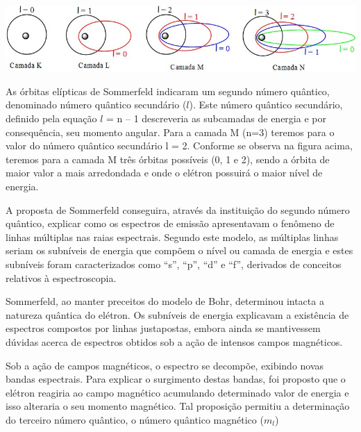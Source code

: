 \documentclass[10pt]{scrartcl}
\begin{document}
\begin{center}
\includegraphics[width=.9\linewidth]{Quimica-Geral-Aula/modelo-atomico-sommerfeld1.png}
\end{center}


As órbitas elípticas de Sommerfeld indicaram um segundo número quântico, denominado número quântico secundário (\(l\)). Este número quântico secundário, definido pela equação \(l\) = n – 1 descreveria as subcamadas de energia e por consequência, seu momento angular. Para a camada M (n=3) teremos para o valor do número quântico secundário l = 2. Conforme se observa na figura acima, teremos para a camada M três órbitas possíveis (0, 1 e 2), sendo a órbita de maior valor a mais arredondada e onde o elétron possuirá o maior nível de energia.

A proposta de Sommerfeld conseguira, através da instituição do segundo número quântico, explicar como os espectros de emissão apresentavam o fenômeno de linhas múltiplas nas raias espectrais. Segundo este modelo, as múltiplas linhas seriam os subníveis de energia que compõem o nível ou camada de energia e estes subníveis foram caracterizados como “s”, “p”, “d” e “f”, derivados de conceitos relativos à espectroscopia.

Sommerfeld, ao manter preceitos do modelo de Bohr, determinou intacta a natureza quântica do elétron. Os subníveis de energia explicavam a existência de espectros compostos por linhas justapostas, embora ainda se mantivessem dúvidas acerca de espectros obtidos sob a ação de intensos campos magnéticos.

Sob a ação de campos magnéticos, o espectro se decompõe, exibindo novas bandas espectrais. Para explicar o surgimento destas bandas, foi proposto que o elétron reagiria ao campo magnético acumulando determinado valor de energia e isso alteraria o seu momento magnético. Tal proposição permitiu a determinação do terceiro número quântico, o número quântico magnético (\(m_l\))
\end{document}
